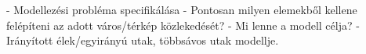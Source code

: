 
- Modellezési probléma specifikálása
- Pontosan milyen elemekből kellene felépíteni az adott város/térkép közlekedését?
- Mi lenne a modell célja?
- Irányított élek/egyirányú utak, többsávos utak modellje.
